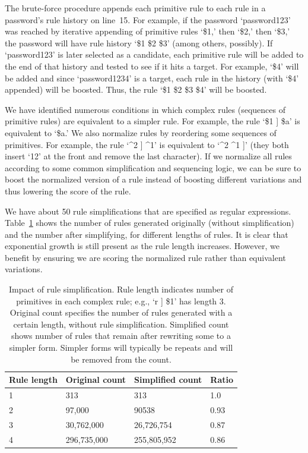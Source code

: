 \documentclass[letterpaper,twocolumn,10pt]{article}
\begin{document}
The brute-force procedure appends each primitive rule to each rule in a
password's rule history on line~15. For example, if the password `password123'
was reached by iterative appending of primitive rules `\$1,' then `\$2,' then
`\$3,' the password will have rule history `\$1 \$2 \$3' (among others,
possibly). If `password123' is later selected as a candidate, each primitive
rule will be added to the end of that history and tested to see if it hits a
target. For example, `\$4' will be added and since `password1234' is a target,
each rule in the history (with `\$4' appended) will be boosted. Thus, the rule
`\$1 \$2 \$3 \$4' will be boosted.

We have identified numerous conditions in which complex rules (sequences of
primitive rules) are equivalent to a simpler rule. For example, the rule `\$1 ]
\$a' is equivalent to `\$a.' We also normalize rules by reordering some
sequences of primitives. For example, the rule `\^{}2 ] \^{}1' is equivalent to
`\^{}2 \^{}1 ]' (they both insert `12' at the front and remove the last
character). If we normalize all rules according to some common simplification
and sequencing logic, we can be sure to boost the normalized version of a rule
instead of boosting different variations and thus lowering the score of the
rule.

We have about 50 rule simplifications that are specified as regular
expressions. Table~\ref{tab:rule-simplification} shows the number of rules
generated originally (without simplification) and the number after simplifying,
for different lengths of rules. It is clear that exponential growth is still
present as the rule length increases. However, we benefit by ensuring we are
scoring the normalized rule rather than equivalent variations.

\begin{table}
\centering
\begin{tabular}{|l|l|l|l|}
\hline
Rule length & Original count & Simplified count & Ratio \\
\hline
1 & 313 & 313 & 1.0 \\
2 & 97,000 & 90538 & 0.93 \\
3 & 30,762,000 & 26,726,754 & 0.87 \\
4 & 296,735,000 & 255,805,952 & 0.86 \\
\hline
\end{tabular}
\caption{Impact of rule simplification. Rule length indicates number of
primitives in each complex rule; e.g., `r ] \$1' has length 3. Original count
specifies the number of rules generated with a certain length, without rule
simplification. Simplified count shows number of rules that remain after
rewriting some to a simpler form. Simpler forms will typically be repeats and
will be removed from the count.}
\label{tab:rule-simplification}
\end{table}
\end{document}
